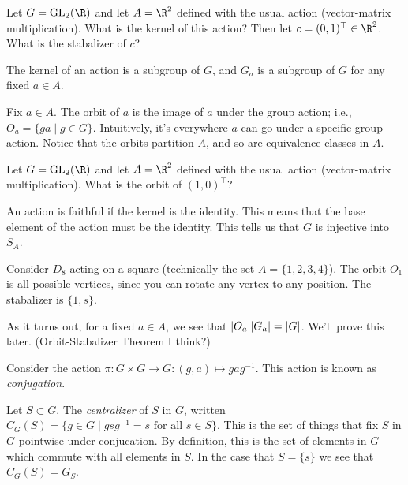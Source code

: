 \begin{example}
Let $G = \mathrm{GL}_2(\R)$ and let $A = \R^2$ defined with the usual action (vector-matrix multiplication). What is the kernel of this action? Then let $c = (0,1)^\top \in \R^2$. What is the stabalizer of $c$?
\end{example}

\begin{corollary}
The kernel of an action is a subgroup of $G$, and $G_a$ is a subgroup of $G$ for any fixed $a \in A$.
\end{corollary}

\begin{definition}[Orbit]
Fix $a \in A$. The orbit of $a$ is the image of $a$ under the group action; i.e., $O_a = \{ga \mid g \in G\}$. Intuitively, it's everywhere $a$ can go under a specific group action. Notice that the orbits partition $A$, and so are equivalence classes in $A$.
\end{definition}

\begin{example}
Let $G = \mathrm{GL}_2(\R)$ and let $A = \R^2$ defined with the usual action (vector-matrix multiplication). What is the orbit of $(1,0)^\top$?
\end{example}

\begin{definition}[Faithful]
An action is faithful if the kernel is the identity. This means that the base element of the action must be the identity. This tells us that $G$ is injective into $S_A$.
\end{definition}

\begin{example}
Consider $D_8$ acting on a square (technically the set $A = \{1,2,3,4\}$). The orbit $O_1$ is all possible vertices, since you can rotate any vertex to any position. The stabalizer is $\{1, s\}$.
\end{example}

\begin{lemma}
As it turns out, for a fixed $a \in A$, we see that $\abs{O_a}\abs{G_a} = \abs{G}$. We'll prove this later. (Orbit-Stabalizer Theorem I think?)
\end{lemma}

\begin{definition}[Conjugation]
Consider the action $\pi : G \times G \to G : (g,a) \mapsto gag^{-1}$. This action is known as \emph{conjugation}.
\end{definition}

\begin{definition}[Centralizer]
Let $S \subset G$. The \emph{centralizer} of $S$ in $G$, written $C_G(S) = \{g \in G \mid gsg^{-1} = s \text{ for all $s \in S$}\}$. This is the set of things that fix $S$ in $G$ pointwise under conjucation. By definition, this is the set of elements in $G$ which commute with all elements in $S$. In the case that $S = \{s\}$ we see that $C_G(S) = G_S$. 
\end{definition}

